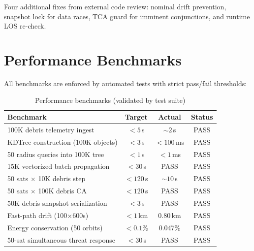 \documentclass[11pt,a4paper]{article}
\begin{document}
Four additional fixes from external code review:
nominal drift prevention, snapshot lock for data races, TCA guard for
imminent conjunctions, and runtime LOS re-check.

\section{Performance Benchmarks}

All benchmarks are enforced by automated tests with strict pass/fail
thresholds:

\begin{table}[H]
\centering
\caption{Performance benchmarks (validated by test suite)}
\begin{tabular}{@{}lccc@{}}
\toprule
\textbf{Benchmark} & \textbf{Target} & \textbf{Actual} & \textbf{Status} \\
\midrule
100K debris telemetry ingest        & $< 5$\,s    & $\sim 2$\,s   & \textcolor{green!60!black}{PASS} \\
KDTree construction (100K objects)  & $< 3$\,s    & $< 100$\,ms   & \textcolor{green!60!black}{PASS} \\
50 radius queries into 100K tree   & $< 1$\,s    & $< 1$\,ms     & \textcolor{green!60!black}{PASS} \\
15K vectorized batch propagation   & $< 30$\,s   & PASS          & \textcolor{green!60!black}{PASS} \\
50 sats $\times$ 10K debris step   & $< 120$\,s  & $\sim 10$\,s  & \textcolor{green!60!black}{PASS} \\
50 sats $\times$ 100K debris CA    & $< 120$\,s  & PASS          & \textcolor{green!60!black}{PASS} \\
50K debris snapshot serialization  & $< 3$\,s    & PASS          & \textcolor{green!60!black}{PASS} \\
Fast-path drift (100$\times$600s)  & $< 1$\,km   & 0.80\,km      & \textcolor{green!60!black}{PASS} \\
Energy conservation (50 orbits)    & $< 0.1$\%   & 0.047\%       & \textcolor{green!60!black}{PASS} \\
50-sat simultaneous threat response & $< 30$\,s   & PASS          & \textcolor{green!60!black}{PASS} \\
\bottomrule
\end{tabular}
\end{table}
\end{document}
